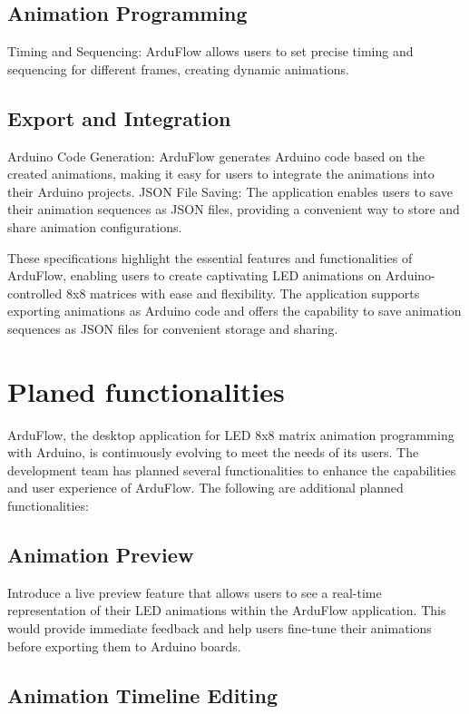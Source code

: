 \documentclass[a4paper, 11pt]{article}
\begin{document}
    \subsection{Animation Programming}
        Timing and Sequencing: ArduFlow allows users to set precise timing and sequencing for different frames, creating dynamic animations.

    \subsection{Export and Integration}
        Arduino Code Generation: ArduFlow generates Arduino code based on the created animations, making it easy for users to integrate the animations into their Arduino projects.
        JSON File Saving: The application enables users to save their animation sequences as JSON files, providing a convenient way to store and share animation configurations.

        \bigbreak


These specifications highlight the essential features and functionalities of ArduFlow, enabling users to create captivating LED animations on Arduino-controlled 8x8 matrices with ease and flexibility. The application supports exporting animations as Arduino code and offers the capability to save animation sequences as JSON files for convenient storage and sharing.

\section{Planed functionalities}

ArduFlow, the desktop application for LED 8x8 matrix animation programming with Arduino, is continuously evolving to meet the needs of its users. The development team has planned several functionalities to enhance the capabilities and user experience of ArduFlow. The following are additional planned functionalities:

\subsection{Animation Preview}
     Introduce a live preview feature that allows users to see a real-time representation of their LED animations within the ArduFlow application. This would provide immediate feedback and help users fine-tune their animations before exporting them to Arduino boards.
     \subsection{Animation Timeline Editing}
\end{document}
